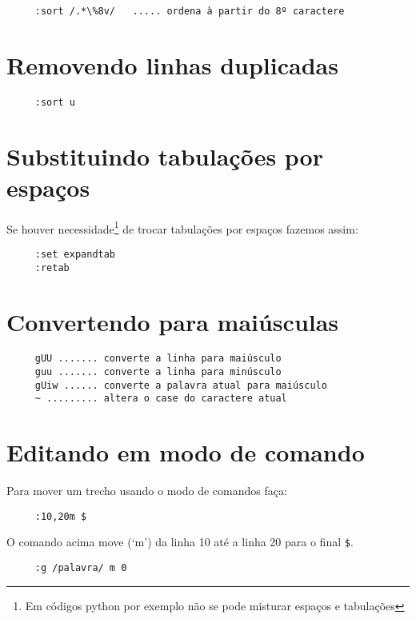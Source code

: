 \begin{verbatim}
     :sort /.*\%8v/   ..... ordena à partir do 8º caractere
\end{verbatim}

\section{Removendo linhas duplicadas}

\begin{verbatim}
     :sort u
\end{verbatim}

\section{Substituindo tabulações por espaços}
\label{sec:Substituindo tabulações por espaços}

Se houver necessidade\footnote{Em códigos python por exemplo não se pode
misturar espaços e tabulações} de trocar tabulações por espaços
fazemos assim:

\begin{verbatim}
	 :set expandtab
	 :retab
\end{verbatim}


\section{Convertendo para maiúsculas}
\label{sec:Convertendo para maiúsculas}

\begin{verbatim}
     gUU ....... converte a linha para maiúsculo
     guu ....... converte a linha para minúsculo
     gUiw ...... converte a palavra atual para maiúsculo
     ~ ......... altera o case do caractere atual
\end{verbatim}


\section{Editando em modo de comando}\label{sec:Editando em modo de comando}

Para mover um trecho usando o modo de comandos faça:

\begin{verbatim}
     :10,20m $
\end{verbatim}

O comando acima move (`m') da linha 10 até a linha 20 para o final \verb|$|.

\begin{verbatim}
     :g /palavra/ m 0
\end{verbatim}

